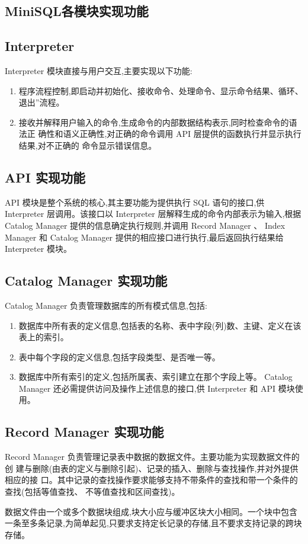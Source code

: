\documentclass[10pt]{article}
\begin{document}
\begin{CJK}{UTF8}{gkai}
	\section{MiniSQL各模块实现功能}
	\subsection{Interpreter}
	Interpreter 模块直接与用户交互,主要实现以下功能:
	\begin{enumerate}
		\item 程序流程控制,即启动并初始化、接收命令、处理命令、显示命令结果、循环、
		退出”流程。
		\item 接收并解释用户输入的命令,生成命令的内部数据结构表示,同时检查命令的语法正
		确性和语义正确性,对正确的命令调用 API 层提供的函数执行并显示执行结果,对不正确的
		命令显示错误信息。
	\end{enumerate}
	\subsection{API 实现功能}
	API 模块是整个系统的核心,其主要功能为提供执行 SQL 语句的接口,供
	Interpreter 层调用。该接口以 Interpreter 层解释生成的命令内部表示为输入,根据
	Catalog Manager 提供的信息确定执行规则,并调用 Record Manager 、 Index Manager 和
	Catalog Manager 提供的相应接口进行执行,最后返回执行结果给 Interpreter 模块。
	\subsection{Catalog Manager 实现功能}
	Catalog Manager 负责管理数据库的所有模式信息,包括:
	\begin{enumerate}
		\item 数据库中所有表的定义信息,包括表的名称、表中字段(列)数、主键、定义在该
		表上的索引。
		\item 表中每个字段的定义信息,包括字段类型、是否唯一等。
		\item 数据库中所有索引的定义,包括所属表、索引建立在那个字段上等。
		Catalog Manager 还必需提供访问及操作上述信息的接口,供 Interpreter 和 API 模块使用。
	\end{enumerate}
	\subsection{Record Manager 实现功能}
	Record Manager 负责管理记录表中数据的数据文件。主要功能为实现数据文件的创
	建与删除(由表的定义与删除引起)、记录的插入、删除与查找操作,并对外提供相应的接
	口。其中记录的查找操作要求能够支持不带条件的查找和带一个条件的查找(包括等值查找、
	不等值查找和区间查找)。
	\par 数据文件由一个或多个数据块组成,块大小应与缓冲区块大小相同。一个块中包含
	一条至多条记录,为简单起见,只要求支持定长记录的存储,且不要求支持记录的跨块存储。

\end{CJK}
\end{document}

